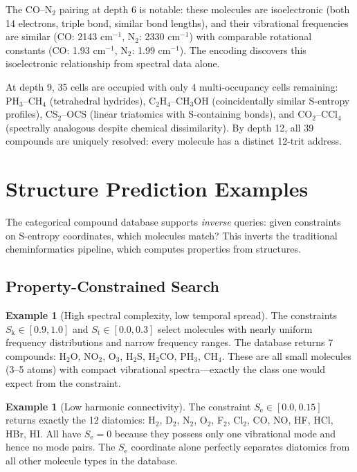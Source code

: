 \documentclass[11pt,twocolumn,a4paper]{article}
\theoremstyle{definition}
\newtheorem{example}[theorem]{Example}
\theoremstyle{remark}
\newcommand{\Sk}{S_{\mathrm{k}}}
\newcommand{\St}{S_{\mathrm{t}}}
\newcommand{\Se}{S_{\mathrm{e}}}
\begin{document}
The CO--N$_2$ pairing at depth 6 is notable: these molecules are isoelectronic (both 14 electrons, triple bond, similar bond lengths), and their vibrational frequencies are similar (CO: 2143 cm$^{-1}$, N$_2$: 2330 cm$^{-1}$) with comparable rotational constants (CO: 1.93 cm$^{-1}$, N$_2$: 1.99 cm$^{-1}$). The encoding discovers this isoelectronic relationship from spectral data alone.

At depth 9, 35 cells are occupied with only 4 multi-occupancy cells remaining: PH$_3$--CH$_4$ (tetrahedral hydrides), C$_2$H$_4$--CH$_3$OH (coincidentally similar S-entropy profiles), CS$_2$--OCS (linear triatomics with S-containing bonds), and CO$_2$--CCl$_4$ (spectrally analogous despite chemical dissimilarity). By depth 12, all 39 compounds are uniquely resolved: every molecule has a distinct 12-trit address.

\section{Structure Prediction Examples}
\label{sec:prediction}

The categorical compound database supports \emph{inverse} queries: given constraints on S-entropy coordinates, which molecules match? This inverts the traditional cheminformatics pipeline, which computes properties from structures.

\subsection{Property-Constrained Search}

\begin{example}[High spectral complexity, low temporal spread]
The constraints $\Sk \in [0.9, 1.0]$ and $\St \in [0.0, 0.3]$ select molecules with nearly uniform frequency distributions and narrow frequency ranges. The database returns 7 compounds: H$_2$O, NO$_2$, O$_3$, H$_2$S, H$_2$CO, PH$_3$, CH$_4$. These are all small molecules (3--5 atoms) with compact vibrational spectra---exactly the class one would expect from the constraint.
\end{example}

\begin{example}[Low harmonic connectivity]
The constraint $\Se \in [0.0, 0.15]$ returns exactly the 12 diatomics: H$_2$, D$_2$, N$_2$, O$_2$, F$_2$, Cl$_2$, CO, NO, HF, HCl, HBr, HI. All have $\Se = 0$ because they possess only one vibrational mode and hence no mode pairs. The $\Se$ coordinate alone perfectly separates diatomics from all other molecule types in the database.
\end{example}
\end{document}
